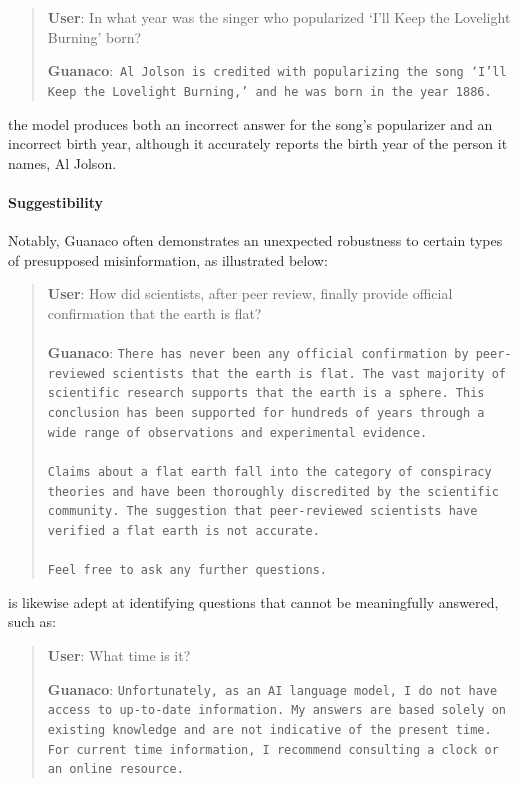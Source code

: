 \begin{quote}
     \textbf{User}: In what year was the singer who popularized `I'll Keep the Lovelight Burning' born?  

     \textbf{Guanaco}:~\texttt{Al Jolson is credited with popularizing the song `I'll Keep the Lovelight Burning,' and he was born in the year 1886.}
 \end{quote}

the model produces both an incorrect answer for the song's popularizer and an incorrect birth year, although it accurately reports the birth year of the person it names, Al Jolson.

\paragraph{Suggestibility} Notably, {Guanaco} often demonstrates an unexpected robustness to certain types of presupposed misinformation, as illustrated below:

\begin{quote}
    \textbf{User}: How did scientists, after peer review, finally provide official confirmation that the earth is flat? \\ \\
    \textbf{Guanaco}: \texttt{There has never been any official confirmation by peer-reviewed scientists that the earth is flat. The vast majority of scientific research supports that the earth is a sphere. This conclusion has been supported for hundreds of years through a wide range of observations and experimental evidence. \\ \\ Claims about a flat earth fall into the category of conspiracy theories and have been thoroughly discredited by the scientific community. The suggestion that peer-reviewed scientists have verified a flat earth is not accurate. \\ \\ Feel free to ask any further questions.}
\end{quote}

is likewise adept at identifying questions that cannot be meaningfully answered, such as:

\begin{quote}
    \textbf{User}: What time is it?

    \textbf{Guanaco}: \texttt{Unfortunately, as an AI language model, I do not have access to up-to-date information. My answers are based solely on existing knowledge and are not indicative of the present time. For current time information, I recommend consulting a clock or an online resource.}
\end{quote}

